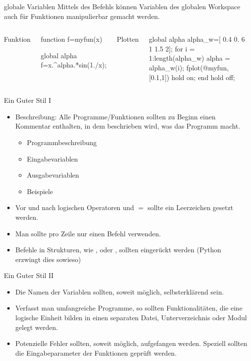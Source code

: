 \documentclass[hyperref={xetex}]{beamer}
\begin{document}
\begin{frame}[fragile]{globale Variablen}
Mittels des Befehls \alert{ } können Variablen des
globalen Workspace auch für Funktionen manipulierbar gemacht werden.
\bigskip
\begin{columns}[t]
\alert{ Funktion}
\begin{matlabin}
function f=myfun(x)

global alpha
f=x.^alpha.*sin(1./x);
\end{matlabin}
\alert{ Plotten}
\begin{matlabin}
global alpha
alpha_w=[ 0.4 0. 6 1 1.5 2];
for i = 1:length(alpha_w)
    alpha = alpha_w(i);
    fplot(@myfun,[0.1,1])
    hold on;
end
hold off;
\end{matlabin}
\end{columns}
\end{frame}
%
%
\begin{frame}[fragile]{Ein Guter Stil I }
\begin{itemize}
\item Beschreibung: Alle Programme/Funktionen sollten zu Beginn einen Kommentar enthalten, in
  dem beschrieben wird, was das Programm macht.
  \begin{itemize}
      \item Programmbeschreibung
      \item Eingabevariablen
      \item Ausgabevariablen
      \item Beispiele
  \end{itemize}
\item Vor und nach logischen Operatoren und $=$ sollte ein Leerzeichen
  gesetzt werden.
\item Man sollte pro Zeile nur einen Befehl verwenden.
\item Befehle in  Strukturen, wie  , 
  oder , sollten eingerückt werden (Python erzwingt dies sowieso)
\end{itemize}
\end{frame}
%
%
\begin{frame}[fragile]{Ein Guter Stil II}
\begin{itemize}
\item Die Namen der Variablen sollten, soweit möglich, selbsterklärend
  sein.
\item Verfasst man umfangreiche Programme, so sollten Funktionalitäten, die
  eine logische Einheit bilden in einen separaten Datei, Unterverzeichnis oder Modul gelegt werden.
\item Potenzielle Fehler sollten, soweit möglich, aufgefangen
  werden. Speziell sollten die Eingabeparameter der Funktionen
  geprüft werden. 
\end{itemize}
\end{frame}
\end{document}
